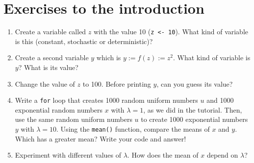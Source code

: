 \section{Exercises to the \RevBayes introduction}

\begin{enumerate}
\item Create a variable called $z$ with the value 10 (\texttt{z <- 10}). What kind of variable is this (constant, stochastic or deterministic)?

\bigskip
\TextField[name=var_type,backgroundcolor=TextFieldBackgroundColor,color=TextFieldTextColor,bordercolor=TextFieldBoxColor,height=1cm,width=\TextFieldWidth,multiline=true]{}
\bigskip

\item Create a second variable $y$ which is $y := f(z) := z ^ 2$. What kind of variable is $y$? What is its value?

\bigskip
\TextField[name=var_type_func,backgroundcolor=TextFieldBackgroundColor,color=TextFieldTextColor,bordercolor=TextFieldBoxColor,height=1cm,width=\TextFieldWidth,multiline=true]{}
\bigskip

\bigskip
\item Change the value of $z$ to 100. Before printing $y$, can you guess its value?

\bigskip
\TextField[name=z_value,backgroundcolor=TextFieldBackgroundColor,color=TextFieldTextColor,bordercolor=TextFieldBoxColor,height=1cm,width=\TextFieldWidth,multiline=true]{}

\bigskip
\item Write a \texttt{for} loop that creates 1000 random uniform numbers $u$ and 1000 exponential random numbers $x$ with $\lambda = 1$, as we did in the tutorial. Then, use the same random uniform numbers $u$ to create 1000 exponential numbers $y$ with $\lambda = 10$. Using the \texttt{mean()} function, compare the means of $x$ and $y$. Which has a greater mean? Write your code and answer!


\bigskip
\TextField[name=random_numbers,backgroundcolor=TextFieldBackgroundColor,color=TextFieldTextColor,bordercolor=TextFieldBoxColor,height=2cm,width=\TextFieldWidth,multiline=true]{}

\bigskip
\item Experiment with different values of $\lambda$. How does the mean of $x$ depend on $\lambda$?

\bigskip
\TextField[name=var_dependencies,backgroundcolor=TextFieldBackgroundColor,color=TextFieldTextColor,bordercolor=TextFieldBoxColor,height=2cm,width=\TextFieldWidth,multiline=true]{}

\end{enumerate}

	

